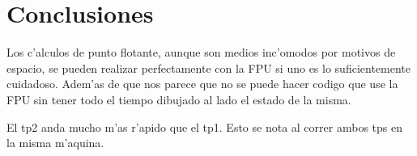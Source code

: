 \section{Conclusiones}

Los c'alculos de punto flotante, aunque son medios inc'omodos por motivos de
espacio, se pueden realizar perfectamente con la FPU si uno es lo
suficientemente cuidadoso. Adem'as de que nos parece que no se puede hacer
codigo que use la FPU sin tener todo el tiempo dibujado al lado el estado de la
misma.

El tp2 anda mucho m'as r'apido que el tp1. Esto se nota al correr ambos tps en
la misma m'aquina.

